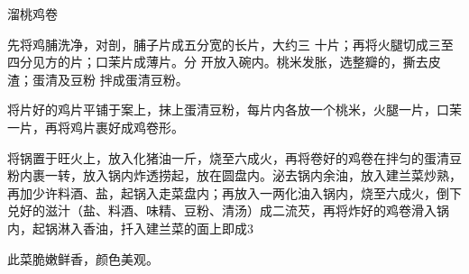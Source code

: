 \begin{recipe}{溜桃鸡卷}

\ingredients





\cooking

先将鸡脯洗净，对剖，脯子片成五分宽的长片，大约三 十片；再将火腿切成三至四分见方的片；口茉片成薄片。分 开放入碗内。桃米发胀，选整瓣的，撕去皮渣；蛋清及豆粉 拌成蛋清豆粉。

\step 将片好的鸡片平铺于案上，抹上蛋清豆粉，每片内各放一个桃米，火腿一片，口茉一片，再将鸡片裹好成鸡卷形。

\step 将锅置于旺火上，放入化猪油一斤，烧至六成火，再将卷好的鸡卷在拌匀的蛋清豆粉内裹一转，放入锅内炸透捞起，放在圆盘内。泌去锅内余油，放入建兰菜炒熟，再加少许料酒、盐，起锅入走菜盘内；再放入一两化油入锅内，烧至六成火，倒下兑好的滋汁（盐、料酒、味精、豆粉、清汤）成二流芡，再将炸好的鸡卷滑入锅内，起锅淋入香油，扦入建兰菜的面上即成3

\notes

此菜脆嫩鲜香，颜色美观。

\end{recipe}


